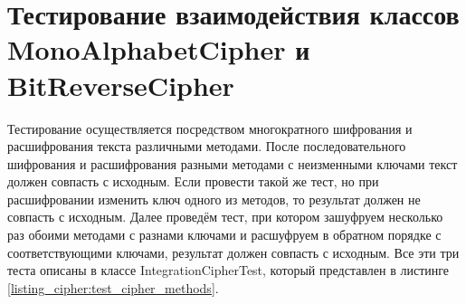 \documentclass[a4paper,12pt]{article}
\begin{document}
\newpage\section{Тестирование взаимодействия классов \\MonoAlphabetCipher и BitReverseCipher}
Тестирование осуществляется посредством многократного шифрования и расшифрования текста различными методами. После последовательного шифрования и расшифрования разными методами с неизменными ключами текст должен совпасть с исходным. Если провести такой же тест, но при расшифровании изменить ключ одного из методов, то результат должен не совпасть с исходным. Далее проведём тест, при котором зашуфруем несколько раз обоими методами с разнами ключами и расшуфруем в обратном порядке с соответствующими ключами, результат должен совпасть с исходным. Все эти три теста описаны в классе IntegrationCipherTest, который представлен в листинге \ref{listing_cipher:test_cipher_methods}.
\end{document}
